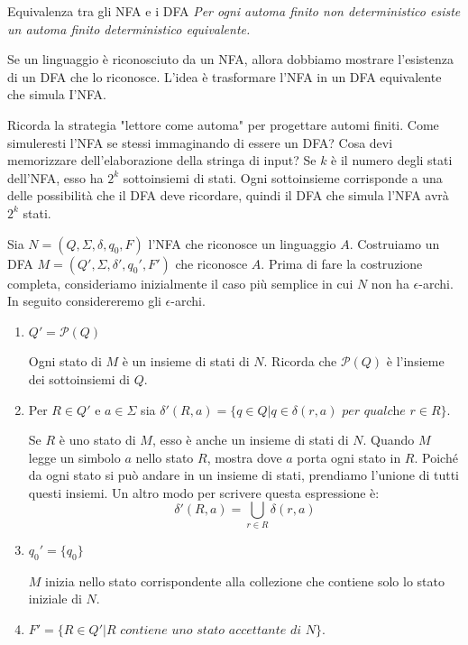 \begin{Thm}{Equivalenza tra gli NFA e i DFA}{}\label{thm:eq-nfa-dfa}
\textit{Per ogni automa finito non deterministico esiste un automa finito deterministico equivalente.}
\begin{osservation}
Se un linguaggio è riconosciuto da un NFA, allora dobbiamo mostrare l'esistenza di un DFA che lo riconosce. L'idea è trasformare l'NFA in un DFA equivalente che simula I'NFA.

Ricorda la strategia "lettore come automa" per progettare automi finiti. Come simuleresti l'NFA se stessi immaginando di essere un DFA? Cosa devi memorizzare dell'elaborazione della stringa di input? Se $k$ è il numero degli stati dell'NFA, esso ha $2 ^ k$ sottoinsiemi di stati. Ogni sottoinsieme corrisponde a una delle possibilità che il DFA deve ricordare, quindi il DFA che simula l'NFA avrà $2 ^ k$ stati.
\end{osservation}

\begin{demonstration}
Sia $N = (Q, \Sigma, \delta, q_{0}, F)$ l'NFA che riconosce un linguaggio $A$. Costruiamo un DFA $M = (Q', \Sigma, \delta', q_{0}', F')$ che riconosce $A$. Prima di fare la costruzione completa, consideriamo inizialmente il caso più semplice in cui $N$ non ha $\epsilon$-archi. In seguito considereremo gli $\epsilon$-archi.
\begin{enumerate}
    \item $Q' = \mathcal{P}(Q)$

    Ogni stato di $M$ è un insieme di stati di $N$. Ricorda che $\mathcal{P}(Q)$ è l'insieme dei sottoinsiemi di $Q$.
    \item Per $R \in Q'$ e $a \in \Sigma$ sia $\delta'(R,a)=\{q \in Q| q \in \delta(r, a) \textit{ per qualche } r \in R\}$.

    Se $R$ è uno stato di $M$, esso è anche un insieme di stati di $N$. Quando $M$ legge un simbolo $a$ nello stato $R$, mostra dove $a$ porta ogni stato in $R$. Poiché da ogni stato si può andare in un insieme di stati, prendiamo l'unione di tutti questi insiemi. Un altro modo per scrivere questa espressione è:
    \begin{equation*}
        \delta'(R,a)=\bigcup_{r \in R}\delta(r, a)
    \end{equation*}
    \item $q_{0}' = \{q_{0}\}$
    
    $M$ inizia nello stato corrispondente alla collezione che contiene solo lo stato iniziale di $N$.
    \item $F' =\{ R \in Q' |R \textit{ contiene uno stato accettante di } N\}$.


\end{enumerate}
\end{demonstration}
\end{Thm}
